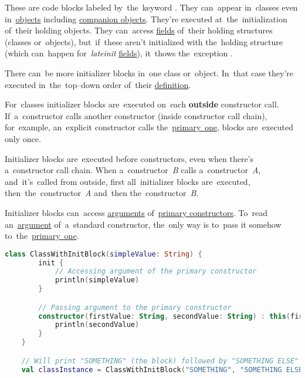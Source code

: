 \label{kotlininitblock}
These are code blocks labeled by~the~keyword .
They can~appear in~classes even in~\hyperref[kotlinobject]{objects} including \hyperref[kotlincompanionobject]{companion objects}.
They're executed at~the~initialization of~their holding objects.
They can~access \hyperref[variablefieldproperty]{fields} of~their holding structures (classes or~objects), but~if~these aren't initialized with the~holding structure (which can~happen for~\textit{lateinit} \hyperref[variablefieldproperty]{fields}), it~thows the~exception .

There can~be more initializer blocks in~one class or~object.
In~that case they're executed in~the~top--down order of~their \hyperref[declarationdefinition]{definition}.

For~classes initializer blocks are~executed on~each \textbf{outside} constructor call.
If~a~constructor calls another constructor (inside constructor call chain), for~example, an~explicit constructor calls the~\hyperref[kotlinprimaryconstructor]{primary~one}, blocks are~executed only once.

Initializer blocks are~executed before constructors, even when there's a~constructor call chain.
When a~constructor~\textit{B} calls a~constructor~\textit{A}, and~it's~called from outside, first all~initializer blocks are~executed, then~the~constructor~\textit{A} and~then the~constructor~\textit{B}.

Initializer blocks can~access \hyperref[parameterargument]{arguments} of~\hyperref[kotlinprimaryconstructor]{primary constructors}.
To~read an~\hyperref[parameterargument]{argument} of~a~standard constructor, the~only way is to~pass it somehow to~the~\hyperref[kotlinprimaryconstructor]{primary~one}.

\begin{lstlisting}[language=Kotlin]
    class ClassWithInitBlock(simpleValue: String) {
        init {
            // Accessing argument of the primary constructor
            println(simpleValue)
        }

        // Passing argument to the primary constructor
        constructor(firstValue: String, secondValue: String) : this(firstValue) {
            println(secondValue)
        }
    }

    // Will print "SOMETHING" (the block) followed by "SOMETHING ELSE" (the constructor)
    val classInstance = ClassWithInitBlock("SOMETHING", "SOMETHING ELSE")
\end{lstlisting}

